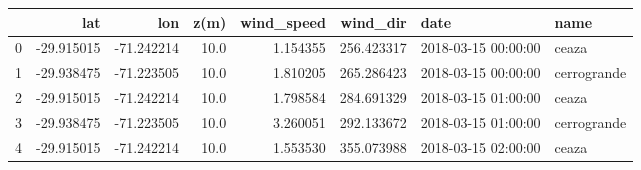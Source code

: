 \begin{tabular}{lrrrrrll}
\toprule
{} &        lat &        lon &  z(m) &  wind\_speed &    wind\_dir &                 date &         name \\
\midrule
0 & -29.915015 & -71.242214 &  10.0 &    1.154355 &  256.423317 &  2018-03-15 00:00:00 &        ceaza \\
1 & -29.938475 & -71.223505 &  10.0 &    1.810205 &  265.286423 &  2018-03-15 00:00:00 &  cerrogrande \\
2 & -29.915015 & -71.242214 &  10.0 &    1.798584 &  284.691329 &  2018-03-15 01:00:00 &        ceaza \\
3 & -29.938475 & -71.223505 &  10.0 &    3.260051 &  292.133672 &  2018-03-15 01:00:00 &  cerrogrande \\
4 & -29.915015 & -71.242214 &  10.0 &    1.553530 &  355.073988 &  2018-03-15 02:00:00 &        ceaza \\
\bottomrule
\end{tabular}
